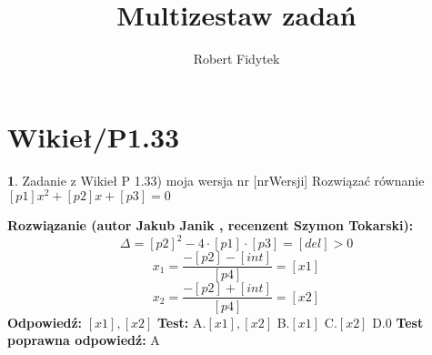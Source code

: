 \documentclass[12pt, a4paper]{article}
\title{Multizestaw zadań}
\author{Robert Fidytek}
\date{}
\theoremstyle{definition} %
\newtheorem{zad}{}
\newcommand{\kategoria}[1]{\section{#1}} %
\newcommand{\zadStart}[1]{\begin{zad}#1\newline} %
\newcommand{\zadStop}{\end{zad}}   %
\newcommand{\rozwStart}[2]{\noindent \textbf{Rozwiązanie (autor #1 , recenzent #2): }\newline} %
\newcommand{\rozwStop}{\newline}                                            %
\newcommand{\odpStart}{\noindent \textbf{Odpowiedź:}\newline}    %
\newcommand{\odpStop}{\newline}                                             %
\newcommand{\testStart}{\noindent \textbf{Test:}\newline} %
\newcommand{\testStop}{\newline} %
\newcommand{\kluczStart}{\noindent \textbf{Test poprawna odpowiedź:}\newline} %
\newcommand{\kluczStop}{\newline} %
\begin{document}
\maketitle


\kategoria{Wikieł/P1.33}
\zadStart{Zadanie z Wikieł P 1.33) moja wersja nr [nrWersji]}
Rozwiązać równanie $[p1]x^2 + [p2]x +[p3] = 0$
\zadStop
\rozwStart{Jakub Janik}{Szymon Tokarski}
$$\Delta = [p2]^2 - 4\cdot[p1]\cdot[p3] = [del] > 0$$
$$x_1 = \frac{-[p2]-[int]}{[p4]}=[x1]$$
$$x_2 = \frac{-[p2]+[int]}{[p4]}=[x2]$$
\rozwStop
\odpStart
$[x1], [x2]$
\odpStop
\testStart
A.$[x1],[x2]$
B.$[x1]$
C.$[x2]$
D.$0$
\testStop
\kluczStart
A
\kluczStop
\end{document}
